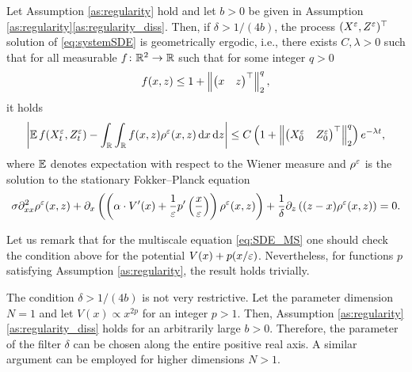\documentclass[10pt]{article}
\begin{document}
\begin{lemma}\label{lem:ergodicity} Let Assumption \ref{as:regularity} hold and let $b > 0$ be given in Assumption \ref{as:regularity}\ref{as:regularity_diss}. Then, if $\delta > 1/(4b)$, the process $(X^\varepsilon, Z^\varepsilon)^\top$ solution of \eqref{eq:systemSDE} is geometrically ergodic, i.e., there exists $C, \lambda > 0$ such that for all measurable $f\colon \mathbb{R}^2\to \mathbb{R}$ such that for some integer $q > 0$ 
	\begin{equation}
		f(x, z) \leq 1 + \left\|\begin{pmatrix} x & z \end{pmatrix}^\top\right\|_2^q,
	\end{equation}
	it holds
	\begin{equation}
		\left\lvert\operatorname{\mathbb{E}} f(X^\varepsilon_t, Z^\varepsilon_t) - \int_{\mathbb{R}}\int_{\mathbb{R}} f(x, z) \rho^\varepsilon(x, z) \,\mathrm{d} x \,\mathrm{d} z\right\rvert \leq C\left(1 + \left\|\begin{pmatrix} X^\varepsilon_0 & Z^\varepsilon_0 \end{pmatrix}^\top\right\|_2^q \right)e^{-\lambda t},
	\end{equation}
	where $\operatorname{\mathbb{E}}$ denotes expectation with respect to the Wiener measure and $\rho^\varepsilon$ is the solution to the stationary Fokker--Planck equation
	\begin{equation}
	\label{eq:FPsystem}
	\sigma \partial^2_{xx} \rho^\varepsilon(x,z) +  \partial_x \left( \left( \alpha \cdot V'(x) + \frac{1}{\varepsilon} p' \left ( \frac{x}{\varepsilon} \right ) \right ) \rho^\varepsilon(x,z) \right) + \frac{1}{\delta} \partial_z \left((z - x) \rho^\varepsilon(x,z)\right) = 0.
	\end{equation}
\end{lemma}

\begin{remark} Let us remark that for the multiscale equation \eqref{eq:SDE_MS} one should check the condition above for the potential $V(x) + p(x/\varepsilon)$. Nevertheless, for functions $p$ satisfying Assumption \ref{as:regularity}, the result holds trivially.
\end{remark}

\begin{remark} The condition $\delta > 1 / (4b)$ is not very restrictive. Let the parameter dimension $N = 1$ and let $V(x) \propto x^{2p}$ for an integer $p > 1$. Then, Assumption \ref{as:regularity}\ref{as:regularity_diss} holds for an arbitrarily large $b > 0$. Therefore, the parameter of the filter $\delta$ can be chosen along the entire positive real axis. A similar argument can be employed for higher dimensions $N > 1$.
\end{remark}
\end{document}

